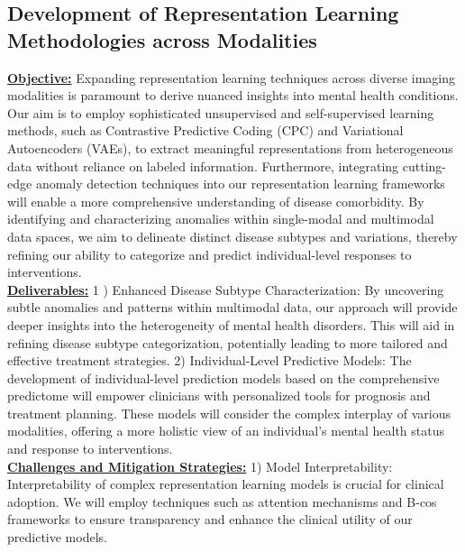 \subsection{Development of Representation Learning Methodologies across Modalities}\label{ssec:predictome}
\textbf{\underline{Objective:}} Expanding representation learning techniques across diverse imaging modalities is paramount to derive nuanced insights into mental health conditions. Our aim is to employ sophisticated unsupervised and self-supervised learning methods, such as Contrastive Predictive Coding (CPC) and Variational Autoencoders (VAEs), to extract meaningful representations from heterogeneous data without reliance on labeled information. Furthermore, integrating cutting-edge anomaly detection techniques into our representation learning frameworks will enable a more comprehensive understanding of disease comorbidity. By identifying and characterizing anomalies within single-modal and multimodal data spaces, we aim to delineate distinct disease subtypes and variations, thereby refining our ability to categorize and predict individual-level responses to interventions.
\noindent\\
\textbf{\underline{Deliverables:}}
1 ) Enhanced Disease Subtype Characterization: By uncovering subtle anomalies and patterns within multimodal data, our approach will provide deeper insights into the heterogeneity of mental health disorders. This will aid in refining disease subtype categorization, potentially leading to more tailored and effective treatment strategies.
2) Individual-Level Predictive Models: The development of individual-level prediction models based on the comprehensive predictome will empower clinicians with personalized tools for prognosis and treatment planning. These models will consider the complex interplay of various modalities, offering a more holistic view of an individual's mental health status and response to interventions.
\noindent\\
\textbf{\underline{Challenges and Mitigation Strategies:}}
1) Model Interpretability: Interpretability of complex representation learning models is crucial for clinical adoption. We will employ techniques such as attention mechanisms and B-cos\cite{bohle2023holistically} frameworks to ensure transparency and enhance the clinical utility of our predictive models.


